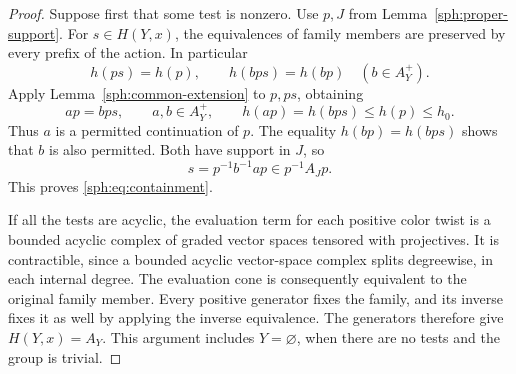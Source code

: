 \begin{proof}
Suppose first that some test is nonzero.
Use \(p,J\) from Lemma~\ref{sph:proper-support}.
For \(s\in H(Y,x)\), the equivalences of family
members are preserved by every prefix of the
action.  In particular
\[
 h(ps)=h(p),\qquad h(bps)=h(bp)
                   \quad(b\in A_Y^+).
\]
Apply Lemma~\ref{sph:common-extension} to
\(p,ps\), obtaining
\[
 ap=bps,\qquad a,b\in A_Y^+,\qquad
 h(ap)=h(bps)\leq h(p)\leq h_0.
\]
Thus \(a\) is a permitted continuation of \(p\).
The equality \(h(bp)=h(bps)\) shows that \(b\)
is also permitted.  Both have support in \(J\),
so
\[
 s=p^{-1}b^{-1}ap\in p^{-1}A_Jp.
\]
This proves \eqref{sph:eq:containment}.

If all the tests are acyclic, the evaluation
term for each positive color twist is a bounded
acyclic complex of graded vector spaces tensored
with projectives.  It is contractible, since a
bounded acyclic vector-space complex splits
degreewise, in each internal degree.
The evaluation cone is consequently equivalent
to the original family member.
Every positive generator fixes the family, and
its inverse fixes it as well by applying the
inverse equivalence.
The generators therefore give
\(H(Y,x)=A_Y\).
This argument includes \(Y=\varnothing\), when
there are no tests and the group is trivial.
\end{proof}
